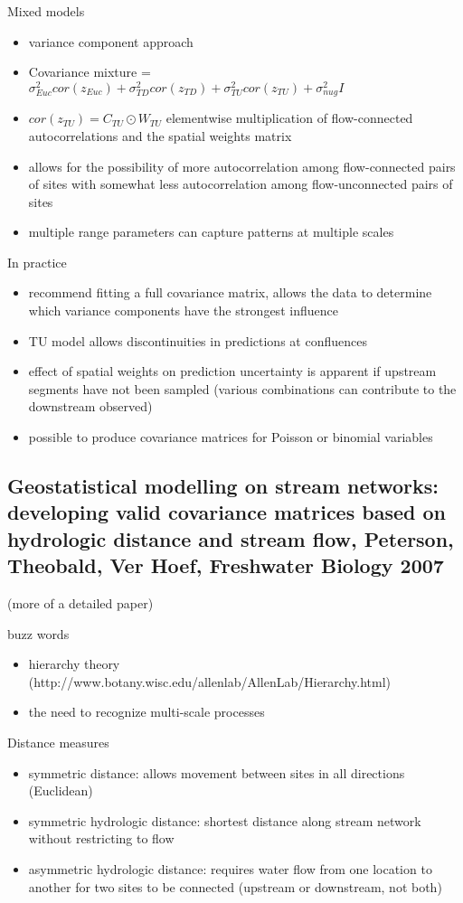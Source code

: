 \documentclass[12pt]{amsart}
\begin{document}
Mixed models
\begin{itemize}
\item variance component approach
\item Covariance mixture = $\sigma^2_{Euc}cor(z_{Euc})+\sigma^2_{TD}cor(z_{TD})+\sigma^2_{TU}cor(z_{TU})+\sigma^2_{nug}I$
\item $cor(z_{TU})= C_{TU} \odot W_{TU}$ elementwise multiplication of flow-connected autocorrelations and the spatial weights matrix 
\item allows for the possibility of more autocorrelation among flow-connected pairs of sites with somewhat less autocorrelation among flow-unconnected pairs of sites
\item multiple range parameters can capture patterns at multiple scales
\end{itemize}

In practice
\begin{itemize}
\item recommend fitting a full covariance matrix, allows the data to determine which variance components have the strongest influence
\item TU model allows discontinuities in predictions at confluences
\item effect of spatial weights on prediction uncertainty is apparent if upstream segments have not been sampled (various combinations can contribute to the downstream observed)
\item possible to produce covariance matrices for Poisson or binomial variables
\end{itemize}

\subsection{Geostatistical modelling on stream networks: developing
valid covariance matrices based on hydrologic distance
and stream flow, Peterson, Theobald, Ver Hoef, Freshwater Biology 2007}

(more of a detailed paper)

buzz words
\begin{itemize}
\item hierarchy theory (http://www.botany.wisc.edu/allenlab/AllenLab/Hierarchy.html)
\item the need to recognize multi-scale processes
\end{itemize}

Distance measures
\begin{itemize}
\item symmetric distance: allows movement between sites in all directions (Euclidean)
\item symmetric hydrologic distance: shortest distance along stream network without restricting to flow
\item asymmetric hydrologic distance: requires water flow from one location to another for two sites to be connected (upstream or downstream, not both)
\end{itemize}
\end{document}
